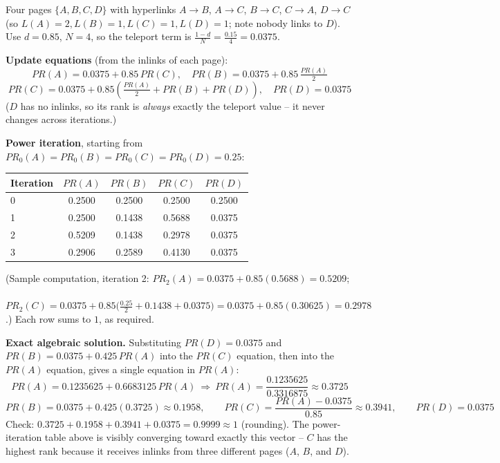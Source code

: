 \documentclass[11pt, a4paper]{article}
\begin{document}
\begin{examplebox}
Four pages $\{A,B,C,D\}$ with hyperlinks $A\to B$, $A\to C$, $B\to C$, $C\to A$, $D\to C$ (so $L(A)=2, L(B)=1, L(C)=1, L(D)=1$; note nobody links to $D$). Use $d=0.85$, $N=4$, so the teleport term is $\frac{1-d}{N}=\frac{0.15}{4}=0.0375$.

\begin{center}
\end{center}

\textbf{Update equations} (from the inlinks of each page):
\[
PR(A)=0.0375+0.85\,PR(C), \quad PR(B)=0.0375+0.85\,\tfrac{PR(A)}{2}
\]
\[
PR(C)=0.0375+0.85\left(\tfrac{PR(A)}{2}+PR(B)+PR(D)\right), \quad PR(D)=0.0375
\]
($D$ has no inlinks, so its rank is \emph{always} exactly the teleport value -- it never changes across iterations.)

\textbf{Power iteration}, starting from $PR_0(A)=PR_0(B)=PR_0(C)=PR_0(D)=0.25$:

\begin{center}
\begin{tabular}{@{}lcccc@{}}
\toprule
Iteration & $PR(A)$ & $PR(B)$ & $PR(C)$ & $PR(D)$ \\
\midrule
0 & 0.2500 & 0.2500 & 0.2500 & 0.2500 \\
1 & 0.2500 & 0.1438 & 0.5688 & 0.0375 \\
2 & 0.5209 & 0.1438 & 0.2978 & 0.0375 \\
3 & 0.2906 & 0.2589 & 0.4130 & 0.0375 \\
\bottomrule
\end{tabular}
\end{center}

(Sample computation, iteration 2: $PR_2(A)=0.0375+0.85(0.5688)=0.5209$; \ $PR_2(C)=0.0375+0.85\big(\tfrac{0.25}{2}+0.1438+0.0375\big)=0.0375+0.85(0.30625)=0.2978$.) Each row sums to $1$, as required.

\textbf{Exact algebraic solution.} Substituting $PR(D)=0.0375$ and $PR(B)=0.0375+0.425\,PR(A)$ into the $PR(C)$ equation, then into the $PR(A)$ equation, gives a single equation in $PR(A)$:
\[
PR(A) = 0.1235625 + 0.6683125\,PR(A) \ \Longrightarrow\ PR(A) = \frac{0.1235625}{0.3316875} \approx 0.3725
\]
\[
PR(B) = 0.0375+0.425(0.3725)\approx0.1958, \qquad PR(C) = \frac{PR(A)-0.0375}{0.85}\approx0.3941, \qquad PR(D)=0.0375
\]
Check: $0.3725+0.1958+0.3941+0.0375 = 0.9999\approx1$ (rounding). The power-iteration table above is visibly converging toward exactly this vector -- $C$ has the highest rank because it receives inlinks from three different pages ($A$, $B$, and $D$).
\end{examplebox}
\end{document}
